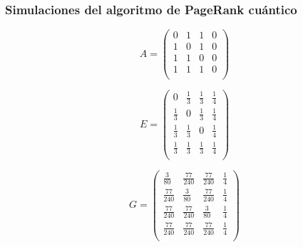 \documentclass[xetex,mathserif,serif, 8pt]{beamer}
\begin{document}
\begin{frame}
    \frametitle{Simulaciones del algoritmo de PageRank cuántico}

\begin{equation}
    A =
    \begin{pmatrix}
        0 & 1 & 1 & 0 \\
        1 & 0 & 1 & 0 \\
        1 & 1 & 0 & 0 \\
        1 & 1 & 1 & 0 \\
    \end{pmatrix}
\end{equation}

\begin{equation}
    E =
    \begin{pmatrix}
        0 & \frac{1}{3} & \frac{1}{3} & \frac{1}{4} \\
        \frac{1}{3} & 0 & \frac{1}{3} & \frac{1}{4} \\
        \frac{1}{3} & \frac{1}{3} & 0 & \frac{1}{4} \\
        \frac{1}{3} & \frac{1}{3} & \frac{1}{3} & \frac{1}{4} \\
    \end{pmatrix}
\end{equation}

\begin{equation}
    G =
    \begin{pmatrix}
        \frac{3}{80} & \frac{77}{240} & \frac{77}{240} & \frac{1}{4} \\
        \frac{77}{240} & \frac{3}{80} & \frac{77}{240} & \frac{1}{4} \\
        \frac{77}{240} & \frac{77}{240} & \frac{3}{80} & \frac{1}{4} \\
        \frac{77}{240} & \frac{77}{240} & \frac{77}{240} & \frac{1}{4} \\
    \end{pmatrix}
\end{equation}

\end{frame}
\end{document}
